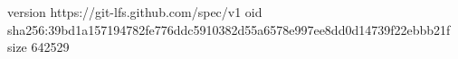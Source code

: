 version https://git-lfs.github.com/spec/v1
oid sha256:39bd1a157194782fe776ddc5910382d55a6578e997ee8dd0d14739f22ebbb21f
size 642529
